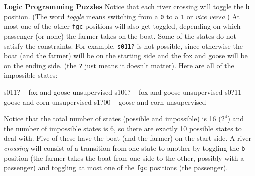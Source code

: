 \begin{minipage}[t]{\sw}
\slidenumber
\LARGE
{\bf Logic Programming Puzzles}\exx
Notice that each river crossing will toggle the \verb'b' position.
(The word {\em toggle} means switching from a \verb'0' to a \verb'1'
or {\em vice versa}.)
At most one of the other \verb'fgc' positions will also get toggled,
depending on which passenger (or none) the farmer takes on the boat.\exx
Some of the states do not satisfy the constraints.
For example, \verb's011?' is not possible,
since otherwise the boat (and the farmer) will be on the starting side
and the fox and goose will be on the ending side.
(the \verb'?' just means it doesn't matter).
Here are all of the impossible states:
\begin{qv}
s011? -- fox and goose unsupervised
s100? -- fox and goose unsupervised
s0?11 -- goose and corn unsupervised
s1?00 -- goose and corn unsupervised
\end{qv}
Notice that the total number of states (possible and impossible) is 16
($2^4$) and the number of impossible states is 6,
so there are exactly 10 possible states to deal with.
Five of these have the boat (and the farmer) on the start side.\exx
A river {\em crossing} will consist of a transition
from one state to another by toggling the \verb'b' position
(the farmer takes the boat from one side to the other,
possibly with a passenger)
and toggling at most one of the \verb'fgc' positions
(the passenger).
\end{minipage}
